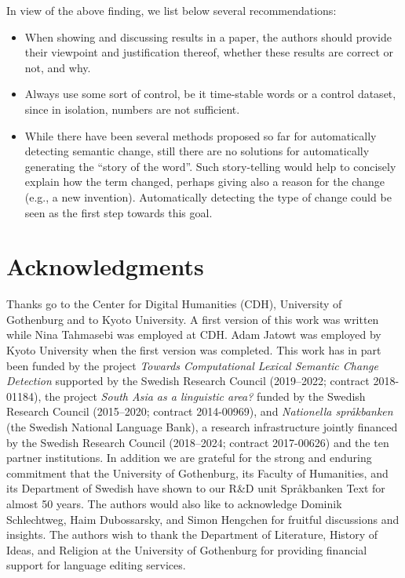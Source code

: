 \documentclass[output=paper]{langsci/langscibook}
\begin{document}
In view of the above finding, we list below several recommendations: 

\begin{itemize}
\item When showing and discussing results in a paper, the authors should provide their viewpoint and justification thereof, whether these results are correct or not, and why. 

\item Always use some sort of control, be it time-stable words or a control dataset, since in isolation, numbers are not sufficient.

\item While there have been several methods proposed so far for automatically detecting semantic change, still there are no solutions for automatically generating the ``story of the word''. Such story-telling would help to concisely explain how the term changed, perhaps giving also a reason for the change (e.g., a new invention). Automatically detecting the type of change could be seen as the first step towards this goal.
\end{itemize}



\section*{Acknowledgments}
Thanks go to the Center for Digital Humanities (CDH), University of Gothenburg and to Kyoto University. A first version of this work was written while Nina Tahmasebi was employed at CDH. Adam Jatowt was employed by Kyoto University when the first version was completed. This work has in part been funded by the project \textit{Towards Computational Lexical Semantic Change Detection} supported  by the Swedish Research Council (2019–2022; contract 2018-01184), the project \emph{South Asia as a linguistic area?} funded by the Swedish Research Council (2015--2020; contract 2014-00969), and \emph{Nationella språkbanken} (the Swedish National Language Bank), a research infrastructure jointly financed by the Swedish Research Council (2018--2024; contract 2017-00626) and the ten partner institutions. In
addition we are grateful for the strong and enduring commitment that the
University of Gothenburg, its Faculty of Humanities, and its
Department of Swedish have shown to our R\&D unit Språkbanken Text for
almost 50 years. 
The authors would also like to acknowledge Dominik Schlechtweg, Haim Dubossarsky, and Simon Hengchen for fruitful discussions and insights.  
The authors wish to thank the Department of Literature, History of Ideas, and Religion at the University of Gothenburg for providing financial support for language editing services.
\end{document}
